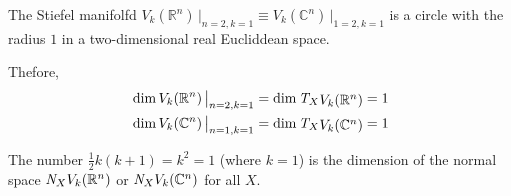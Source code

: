 \documentclass[conference,onecolumn]{IEEEtran}
\begin{document}
The Stiefel manifolfd 
$V_k(\mathbb{R}^{n}) \,\big|_{n = 2, k=1} \equiv 
V_k(\mathbb{C}^{n}) \,\big|_{1 = 2, k=1}
$ is a circle with the radius $1$ in a two-dimensional real Eucliddean space.


\newcommand{\tspace}{
\mathit{T}_{X} \raisebox{-0.12em}{$V_k(\mathbb{R}^{n})$} 
}

\newcommand{\tspaceC}{
	\mathit{T}_{X} \raisebox{-0.12em}{$V_k(\mathbb{C}^{n})$} 
}

\newcommand{\nspace}{
	\mathit{N}_{X} \raisebox{0em}{$V_k(\mathbb{R}^{n})$} 
}

\newcommand{\nspaceC}{
	\mathit{N}_{X} \raisebox{0em}{$V_k(\mathbb{C}^{n})$} 
}


Thefore, 
\begin{equation}
\begin{aligned}
&\operatorname{dim}  V_k(\mathbb{R}^{n}) \,\big|_{n = 2, k=1} = \operatorname{dim} \tspace
 =   1       \\
&\operatorname{dim}  V_k(\mathbb{C}^{n}) \,\big|_{n = 1, k=1} = 
\operatorname{dim} \tspaceC = 
1 
\end{aligned}
\end{equation} 

The number $\frac{1}{2}k(k+1) = k^{2} = 1 $ (where $k = 1$) is the dimension of the normal space 
$\nspace$ or $\nspaceC$ for all $X$. 
	
	
%
%
\end{document}
